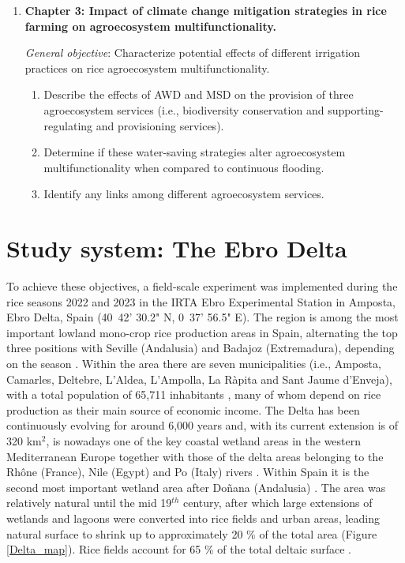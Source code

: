 {\begin{enumerate}
\begin{enumerate}
\end{enumerate}

\item \textbf{Chapter 3: Impact of climate change mitigation strategies in rice farming on agroecosystem multifunctionality.}

\textit{General objective}: Characterize potential effects of different irrigation practices on rice agroecosystem multifunctionality.

\begin{enumerate}
   \item Describe the effects of AWD and MSD on the provision of three agroecosystem services (i.e., biodiversity conservation and supporting-regulating and provisioning services).
   \item Determine if these water-saving strategies alter agroecosystem multifunctionality when compared to continuous flooding.
   \item Identify any links among different agroecosystem services.
   
\end{enumerate}

\end{enumerate}

}

\section*{Study system: The Ebro Delta}

To achieve these objectives, a field-scale experiment was implemented during the rice seasons 2022 and 2023 in the IRTA Ebro Experimental Station in Amposta, Ebro Delta, Spain (40\degree\ 42' 30.2" N, 0\degree\ 37' 56.5" E). The region is among the most important lowland mono-crop rice production areas in Spain, alternating the top three positions with Seville (Andalusia) and Badajoz (Extremadura), depending on the season \citep{mapa2022}. Within the area there are seven municipalities (i.e., Amposta, Camarles, Deltebre, L'Aldea, L'Ampolla, La Ràpita and Sant Jaume d'Enveja), with a total population of 65,711 inhabitants \citep{torres2021analisis, ine2024}, many of whom depend on rice production as their main source of economic income. The Delta has been continuously evolving for around 6,000 years and, with its current extension is of 320 km$^{2}$, is nowadays one of the key coastal wetland areas in the western Mediterranean Europe together with those of the delta areas belonging to the Rhône (France), Nile (Egypt) and Po (Italy) rivers \citep{canicio1999holocene, romagosa2013sustainability, azzopardi2020climate}. Within Spain it is the second most important wetland area after Doñana (Andalusia) \citep{rodriguez-santalla2021}. The area was relatively natural until the mid 19$^{th}$ century, after which large extensions of wetlands and lagoons were converted into rice fields and urban areas, leading natural surface to shrink up to approximately 20 \% of the total area \citep{day2006} (Figure \ref{Delta_map}). Rice fields account for 65 \% of the total deltaic surface \citep{morant2020}.\\

